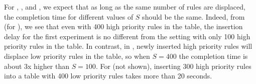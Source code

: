 \begin{figure}
\hfill
{}
\label{fig:burst-completion-time}
\end{figure}


For \BroadcomOne, \BroadcomThree, and \IBM, we expect that as long as the same
number of rules are displaced, the completion time for different values of
$S$ should be the same.
Indeed, from  (for
\BroadcomOne), we see that even with 400 high priority rules in the
table, the insertion delay for the first experiment is no different from the
setting with only 100 high priority rules in the table. In contrast, in
, newly inserted high
priority rules will displace low priority rules in the table, so when
$S=400$ the completion time is about 3x higher than $S=100$.
For \IBM (not shown), inserting 300 high priority rules into a table with 400
low priority rules takes more than 20 seconds.  

